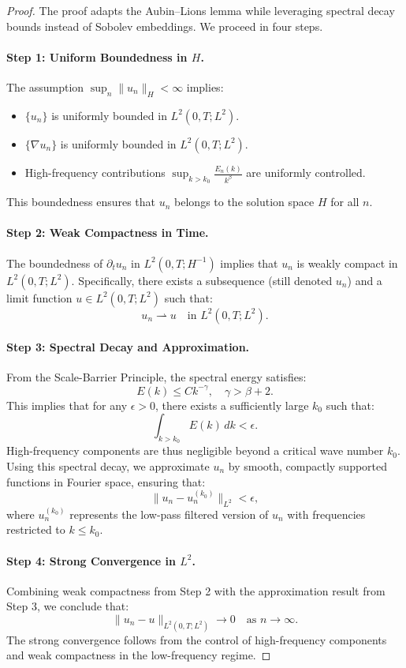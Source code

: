 \documentclass[12pt]{article}
\theoremstyle{definition}
\begin{document}
\begin{proof}
The proof adapts the Aubin--Lions lemma while leveraging spectral decay bounds instead of Sobolev embeddings. We proceed in four steps.

\paragraph{Step 1: Uniform Boundedness in $H$.}
The assumption $\sup_n \|u_n\|_H < \infty$ implies:
\begin{itemize}
    \item $\{u_n\}$ is uniformly bounded in $L^2(0, T; L^2)$.
    \item $\{\nabla u_n\}$ is uniformly bounded in $L^2(0, T; L^2)$.
    \item High-frequency contributions $\sup_{k > k_0} \frac{E_n(k)}{k^\beta}$ are uniformly controlled.
\end{itemize}
This boundedness ensures that $u_n$ belongs to the solution space $H$ for all $n$.

\paragraph{Step 2: Weak Compactness in Time.}
The boundedness of $\partial_t u_n$ in $L^2(0, T; H^{-1})$ implies that $u_n$ is weakly compact in $L^2(0, T; L^2)$. Specifically, there exists a subsequence (still denoted $u_n$) and a limit function $u \in L^2(0, T; L^2)$ such that:
\[
    u_n \rightharpoonup u \quad \text{in } L^2(0, T; L^2).
\]

\paragraph{Step 3: Spectral Decay and Approximation.}
From the Scale-Barrier Principle, the spectral energy satisfies:
\[
E(k) \leq C k^{-\gamma}, \quad \gamma > \beta + 2.
\]
This implies that for any $\epsilon > 0$, there exists a sufficiently large $k_0$ such that:
\[
\int_{k > k_0} E(k) \, dk < \epsilon.
\]
High-frequency components are thus negligible beyond a critical wave number $k_0$. Using this spectral decay, we approximate $u_n$ by smooth, compactly supported functions in Fourier space, ensuring that:
\[
\|u_n - u_n^{(k_0)}\|_{L^2} < \epsilon,
\]
where $u_n^{(k_0)}$ represents the low-pass filtered version of $u_n$ with frequencies restricted to $k \leq k_0$.

\paragraph{Step 4: Strong Convergence in $L^2$.}
Combining weak compactness from Step 2 with the approximation result from Step 3, we conclude that:
\[
\|u_n - u\|_{L^2(0, T; L^2)} \to 0 \quad \text{as } n \to \infty.
\]
The strong convergence follows from the control of high-frequency components and weak compactness in the low-frequency regime.
\qedhere
\end{proof}
\end{document}
